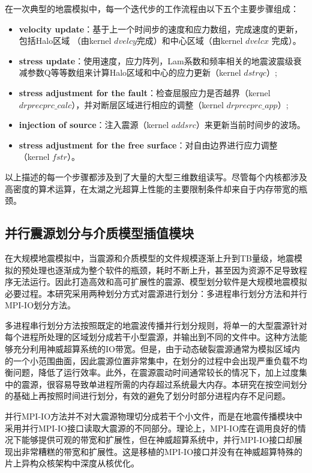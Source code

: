 \documentclass[degree=doctor]{thuthesis}
\begin{document}
在一次典型的地震模拟中，每一个迭代步的工作流程由以下五个主要步骤组成：

\begin{itemize}
\item {\bf velocity update}：基于上一个时间步的速度和应力数组，完成速度的更新，包括Halo区域 （由kernel $dvelcy$完成）和中心区域（由kernel $dvelcx$ 完成）。

\item {\bf stress update}：使用速度，应力阵列，Lam系数和频率相关的地震波震级衰减参数Q等等数组来计算Halo区域和中心的应力更新（kernel $dstrqc$）;

\item {\bf stress adjustment for the fault}：检查屈服应力是否越界（kernel $drprecprc\_calc$），并对断层区域进行相应的调整（kernel $drprecprc\_app$）;

\item {\bf injection of source}：注入震源（kernel $addsrc$）来更新当前时间步的波场。

\item {\bf stress adjustment for the free surface}：对自由边界进行应力调整（kernel $fstr$）。
\end{itemize}

以上描述的每一个步骤都涉及到了大量的大型三维数组读写。尽管每个内核都涉及高密度的算术运算，在太湖之光超算上性能的主要限制条件却来自于内存带宽的瓶颈。


\subsection{并行震源划分与介质模型插值模块}
\label{sub:并行震源划分与介质模型插值模块}
在大规模地震模拟中，当震源和介质模型的文件规模逐渐上升到TB量级，地震模拟的预处理也逐渐成为整个软件的瓶颈，耗时不断上升，甚至因为资源不足导致程序无法运行。因此打造高效和高可扩展性的震源、模型划分软件是大规模地震模拟必要过程。本研究采用两种划分方式对震源进行划分：多进程串行划分方法和并行MPI-IO划分方法。

多进程串行划分方法按照既定的地震波传播并行划分规则，将单一的大型震源针对每个进程所处理的区域划分成若干小型震源，并输出到不同的文件中。这种方法能够充分利用神威超算系统的IO带宽。但是，由于动态破裂震源通常为模拟区域内的一个小范围曲面，因此震源位置非常集中，在划分的过程中会出现严重负载不均衡问题，降低了运行效率。此外，在震源震动时间通常较长的情况下，加上过度集中的震源，很容易导致单进程所需的内存超过系统最大内存。本研究在按空间划分的基础上再按照时间进行划分，有效的避免了划分时部分进程内存不足问题。

并行MPI-IO方法并不对大震源物理切分成若干个小文件，而是在地震传播模块中采用并行MPI-IO接口读取大震源的不同部分。理论上，MPI-IO库在调用良好的情况下能够提供可观的带宽和扩展性，但在神威超算系统中，并行MPI-IO接口却展现出非常糟糕的带宽和扩展性。这是移植的MPI-IO接口并没有在神威超算特殊的片上异构众核架构中深度从核优化。
\end{document}

